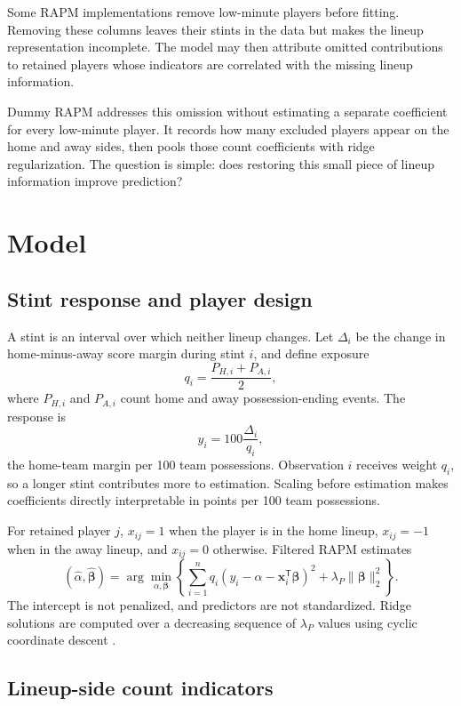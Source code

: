 \documentclass[12pt]{article}
\begin{document}
Some RAPM implementations remove low-minute players before fitting. Removing
these columns leaves their stints in the data but makes the lineup
representation incomplete. The model may then attribute omitted contributions
to retained players whose indicators are correlated with the missing lineup
information.

Dummy RAPM addresses this omission without estimating a separate coefficient
for every low-minute player. It records how many excluded players appear on
the home and away sides, then pools those count coefficients with ridge
regularization. The question is simple: does restoring this small piece of
lineup information improve prediction?

\section{Model}

\subsection{Stint response and player design}

A stint is an interval over which neither lineup changes. Let $\Delta_i$ be the
change in home-minus-away score margin during stint $i$, and define exposure
\[
q_i = \frac{P_{H,i}+P_{A,i}}{2},
\]
where $P_{H,i}$ and $P_{A,i}$ count home and away possession-ending events.
The response is
\[
y_i = 100\frac{\Delta_i}{q_i},
\]
the home-team margin per 100 team possessions. Observation $i$ receives weight
$q_i$, so a longer stint contributes more to estimation. Scaling before
estimation makes coefficients directly interpretable in points per 100 team
possessions.

For retained player $j$, $x_{ij}=1$ when the player is in the home lineup,
$x_{ij}=-1$ when in the away lineup, and $x_{ij}=0$ otherwise. Filtered RAPM
estimates
\[
\left(\hat{\alpha},\hat{\boldsymbol{\beta}}\right)
=
\arg\min_{\alpha,\boldsymbol{\beta}}
\left\{
\sum_{i=1}^{n}q_i
\left(y_i-\alpha-\mathbf{x}_i^\mathsf{T}\boldsymbol{\beta}\right)^2
+\lambda_P\|\boldsymbol{\beta}\|_2^2
\right\}.
\]
The intercept is not penalized, and predictors are not standardized. Ridge
solutions are computed over a decreasing sequence of $\lambda_P$ values using
cyclic coordinate descent \citep{FriedmanHastieTibshirani2010}.

\subsection{Lineup-side count indicators}
\end{document}
